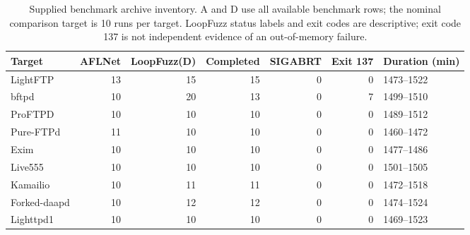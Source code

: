 \begin{table}[!tp]
\centering\small
\caption{Supplied benchmark archive inventory. A and D use all available benchmark rows; the nominal comparison target is 10 runs per target. LoopFuzz status labels and exit codes are descriptive; exit code 137 is not independent evidence of an out-of-memory failure.}
\label{tab:observed_inventory}
\begin{tabular}{lrrrrrl}
\toprule
Target & AFLNet & LoopFuzz(D) & Completed & SIGABRT & Exit 137 & Duration (min) \\
\midrule
LightFTP & 13 & 15 & 15 & 0 & 0 & 1473--1522 \\
bftpd & 10 & 20 & 13 & 0 & 7 & 1499--1510 \\
ProFTPD & 10 & 10 & 10 & 0 & 0 & 1489--1512 \\
Pure-FTPd & 11 & 10 & 10 & 0 & 0 & 1460--1472 \\
Exim & 10 & 10 & 10 & 0 & 0 & 1477--1486 \\
Live555 & 10 & 10 & 10 & 0 & 0 & 1501--1505 \\
Kamailio & 10 & 11 & 11 & 0 & 0 & 1472--1518 \\
Forked-daapd & 10 & 12 & 12 & 0 & 0 & 1474--1524 \\
Lighttpd1 & 10 & 10 & 10 & 0 & 0 & 1469--1523 \\
\bottomrule
\end{tabular}
\end{table}
